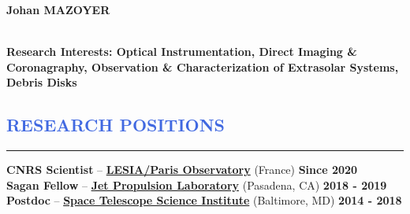 \documentclass[11pt]{article}
\begin{document}
\lhead[]{}
\lfoot{\textcolor{Gray}{CV last update: \monthyeardate\today}}

\begin{huge}
\noindent\textbf{Johan MAZOYER}
\end{huge}\\


\textbf{Research Interests: Optical Instrumentation, Direct Imaging \& Coronagraphy,
Observation \& Characterization of Extrasolar Systems, Debris Disks}\\


\vspace{-1.0cm}
\textcolor{RoyalBlue}{\section{\large RESEARCH POSITIONS}
\vspace{-0.35cm}\hrule}
\vspace{0.4cm}

\textbf{CNRS Scientist} --
\href{http://www.obspm.fr/?lang=en}{\textbf{LESIA/Paris Observatory}} (France)
\hfill     	 { \bf Since 2020}\\

\vspace{-0.3cm}
\textbf{Sagan Fellow} --
\href{https://www.jpl.nasa.gov/}{\textbf{Jet Propulsion Laboratory}} (Pasadena, CA)
\hfill      { \bf 2018 - 2019}\\


\vspace{-0.3cm}
\textbf{Postdoc} --
{\href{http://www.stsci.edu}{\textbf{Space Telescope Science Institute}}} (Baltimore, MD)
\hfill        { \bf 2014 - 2018}\\
\end{document}
